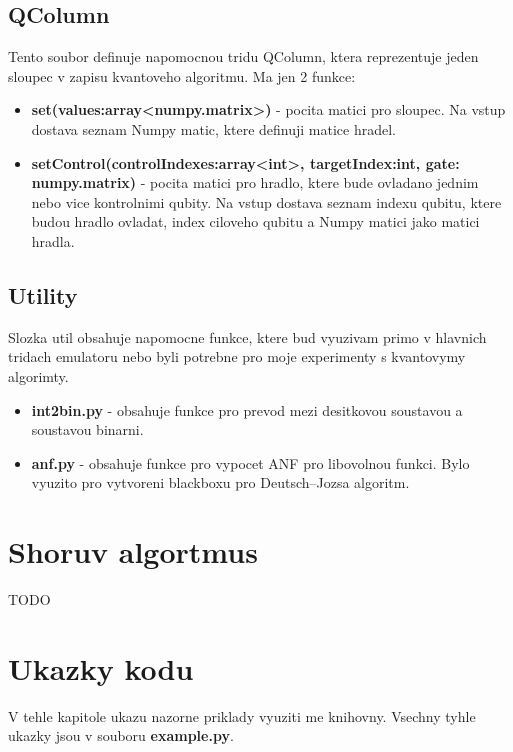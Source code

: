 \documentclass[12pt]{article}
\begin{document}
\subsection{QColumn}
Tento soubor  definuje napomocnou tridu QColumn, ktera reprezentuje jeden sloupec v zapisu kvantoveho algoritmu.
Ma jen 2 funkce:
\begin{itemize}
    \item \textbf{set(values:array<numpy.matrix>)} - pocita matici pro sloupec.
          Na vstup dostava seznam Numpy matic, ktere definuji matice hradel.
    \item \textbf{setControl(controlIndexes:array<int>, targetIndex:int, gate: numpy.matrix)} - pocita matici pro hradlo, ktere bude ovladano jednim nebo vice kontrolnimi qubity.
          Na vstup dostava seznam indexu qubitu, ktere budou hradlo ovladat, index ciloveho qubitu a Numpy matici jako matici hradla.
\end{itemize}

\subsection{Utility}
Slozka util obsahuje napomocne funkce, ktere bud vyuzivam primo v hlavnich tridach emulatoru nebo byli potrebne pro moje experimenty s kvantovymy algorimty.
\begin{itemize}
    \item \textbf{int2bin.py} - obsahuje funkce pro prevod mezi desitkovou soustavou a soustavou binarni.
    \item \textbf{anf.py} - obsahuje funkce pro vypocet ANF pro libovolnou funkci.
          Bylo vyuzito pro vytvoreni blackboxu pro Deutsch–Jozsa algoritm.
\end{itemize}

\newpage

\section{Shoruv algortmus}
TODO
\newpage

\section{Ukazky kodu}
V tehle kapitole ukazu nazorne priklady vyuziti me knihovny.
Vsechny tyhle ukazky jsou v souboru \textbf{example.py}.
\end{document}
